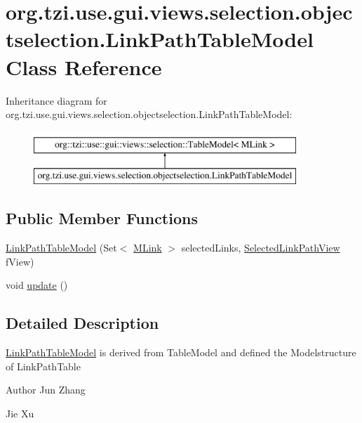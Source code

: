 \hypertarget{classorg_1_1tzi_1_1use_1_1gui_1_1views_1_1selection_1_1objectselection_1_1_link_path_table_model}{\section{org.\-tzi.\-use.\-gui.\-views.\-selection.\-objectselection.\-Link\-Path\-Table\-Model Class Reference}
\label{classorg_1_1tzi_1_1use_1_1gui_1_1views_1_1selection_1_1objectselection_1_1_link_path_table_model}
}
Inheritance diagram for org.\-tzi.\-use.\-gui.\-views.\-selection.\-objectselection.\-Link\-Path\-Table\-Model\-:\begin{figure}[H]
\begin{center}
\leavevmode
\includegraphics[height=2.000000cm]{classorg_1_1tzi_1_1use_1_1gui_1_1views_1_1selection_1_1objectselection_1_1_link_path_table_model}
\end{center}
\end{figure}
\subsection*{Public Member Functions}
\begin{DoxyCompactItemize}
\item 
\hyperlink{classorg_1_1tzi_1_1use_1_1gui_1_1views_1_1selection_1_1objectselection_1_1_link_path_table_model_a16715db87572a2848f3821c51a892b96}{Link\-Path\-Table\-Model} (Set$<$ \hyperlink{interfaceorg_1_1tzi_1_1use_1_1uml_1_1sys_1_1_m_link}{M\-Link} $>$ selected\-Links, \hyperlink{classorg_1_1tzi_1_1use_1_1gui_1_1views_1_1selection_1_1objectselection_1_1_selected_link_path_view}{Selected\-Link\-Path\-View} f\-View)
\item 
void \hyperlink{classorg_1_1tzi_1_1use_1_1gui_1_1views_1_1selection_1_1objectselection_1_1_link_path_table_model_a7299d1eb53e8ec825929d2b2ca9447fc}{update} ()
\end{DoxyCompactItemize}


\subsection{Detailed Description}
\hyperlink{classorg_1_1tzi_1_1use_1_1gui_1_1views_1_1selection_1_1objectselection_1_1_link_path_table_model}{Link\-Path\-Table\-Model} is derived from Table\-Model and defined the Modelstructure of Link\-Path\-Table \begin{DoxyAuthor}{Author}
Jun Zhang 

Jie Xu 
\end{DoxyAuthor}


